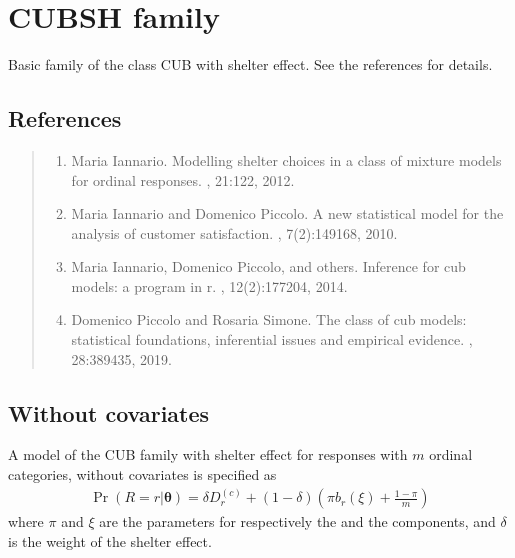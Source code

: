 \documentclass[letterpaper,10pt,english]{sphinxmanual}
\begin{document}
\noindent{}


\section{CUBSH family}
\label{\detokenize{manual:cubsh-family}}
\sphinxAtStartPar
Basic family of the class CUB with shelter effect.
See the references for details.


\subsection{References}
\label{\detokenize{manual:id38}}\begin{quote}
\begin{enumerate}
%
\setcounter{enumi}{0}
\item {} 
\sphinxAtStartPar
Maria Iannario. Modelling shelter choices in a class of mixture models for ordinal responses. , 21:1\textendash{}22, 2012.

\item {} 
\sphinxAtStartPar
Maria Iannario and Domenico Piccolo. A new statistical model for the analysis of customer satisfaction. , 7(2):149\textendash{}168, 2010.

\item {} 
\sphinxAtStartPar
Maria Iannario, Domenico Piccolo, and others. Inference for cub models: a program in r. , 12(2):177\textendash{}204, 2014.

\item {} 
\sphinxAtStartPar
Domenico Piccolo and Rosaria Simone. The class of cub models: statistical foundations, inferential issues and empirical evidence. , 28:389\textendash{}435, 2019.

\end{enumerate}
\end{quote}


\subsection{Without covariates}
\label{\detokenize{manual:id76}}
\sphinxAtStartPar
A model of the CUB family with shelter effect
for responses with \(m\) ordinal categories, without covariates is specified as
\begin{equation*}
\begin{split}\Pr(R=r|\boldsymbol{\theta}) = \delta D_r^{(c)} + (1-\delta)\left(\pi b_r(\xi) + \frac{1-\pi}{m} \right)\end{split}
\end{equation*}
\sphinxAtStartPar
where \(\pi\) and \(\xi\) are the parameters for respectively the  and the
 components, and \(\delta\) is the weight of the shelter effect.
\end{document}
